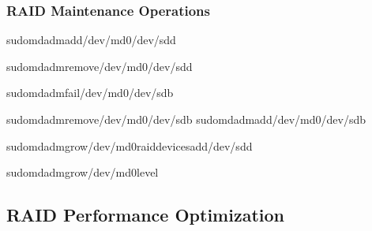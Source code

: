 \documentclass[letterpaper,10pt,english]{sphinxmanual}
\begin{document}
\subsubsection{RAID Maintenance Operations}
\label{\detokenize{raid-systems:raid-maintenance-operations}}
\begin{sphinxVerbatim}[commandchars=\\\{\}]
sudomdadm\PYGZhy{}\PYGZhy{}add/dev/md0/dev/sdd

sudomdadm\PYGZhy{}\PYGZhy{}remove/dev/md0/dev/sdd

sudomdadm\PYGZhy{}\PYGZhy{}fail/dev/md0/dev/sdb

sudomdadm\PYGZhy{}\PYGZhy{}remove/dev/md0/dev/sdb
sudomdadm\PYGZhy{}\PYGZhy{}add/dev/md0/dev/sdb

sudomdadm\PYGZhy{}\PYGZhy{}grow/dev/md0\PYGZhy{}\PYGZhy{}raid\PYGZhy{}devices\PYGZhy{}\PYGZhy{}add/dev/sdd

sudomdadm\PYGZhy{}\PYGZhy{}grow/dev/md0\PYGZhy{}\PYGZhy{}level
\end{sphinxVerbatim}


\subsection{RAID Performance Optimization}
\label{\detokenize{raid-systems:raid-performance-optimization}}
\end{document}

